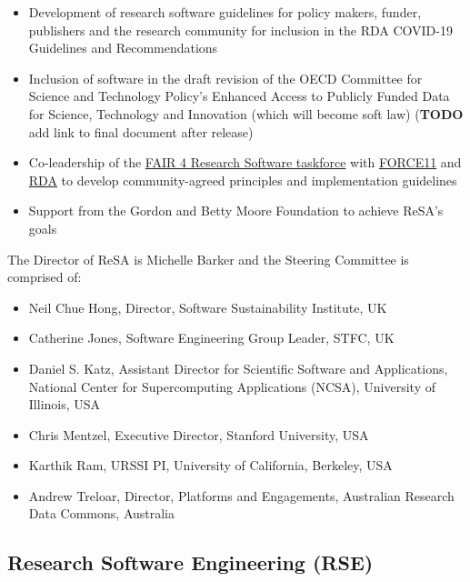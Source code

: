 \documentclass[
]{book}
\providecommand{\tightlist}{%
  \setlength{\itemsep}{0pt}\setlength{\parskip}{0pt}}
\begin{document}
\begin{itemize}
\item
  Development of research software guidelines for policy makers, funder, publishers and
  the research community for inclusion in the RDA COVID-19 Guidelines and Recommendations \citep{RDA-covid-recs-final}
\item
  Inclusion of software in the draft revision of the OECD Committee for Science and Technology
  Policy's Enhanced Access to Publicly Funded Data for Science, Technology and Innovation (which will become soft law) (\textbf{TODO} add link to final document after release)
\item
  Co-leadership of the \href{https://www.rd-alliance.org/groups/fair-4-research-software-fair4rs-wg}{FAIR 4 Research Software taskforce}
  with \href{https://www.force11.org/}{FORCE11}
  and \href{https://www.rd-alliance.org/}{RDA} to develop community-agreed principles and implementation guidelines
\item
  Support from the Gordon and Betty Moore Foundation to achieve ReSA's goals
\end{itemize}

The Director of ReSA is Michelle Barker and the Steering Committee is comprised of:

\begin{itemize}
\tightlist
\item
  Neil Chue Hong, Director, Software Sustainability Institute, UK
\item
  Catherine Jones, Software Engineering Group Leader, STFC, UK
\item
  Daniel S. Katz, Assistant Director for Scientific Software and Applications, National Center for Supercomputing Applications (NCSA), University of Illinois, USA
\item
  Chris Mentzel, Executive Director, Stanford University, USA
\item
  Karthik Ram, URSSI PI, University of California, Berkeley, USA
\item
  Andrew Treloar, Director, Platforms and Engagements, Australian Research Data Commons, Australia
\end{itemize}

\hypertarget{research-software-engineering-rse}{%
\subsection{Research Software Engineering (RSE)}\label{research-software-engineering-rse}}
\end{document}
